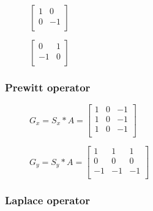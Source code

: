 \begin{figure}[!htb]
    \centering
    \begin{minipage}{.5\textwidth}
        \centering
        $\left[ \begin{array}{rr}
        1 & 0 \\
        0 & -1 \\
        \end{array}\right] $
    \end{minipage}%
    \begin{minipage}{.5\textwidth}
        \centering
        $\left[ \begin{array}{rr}
        0 & 1 \\
        -1 & 0 \\
        \end{array}\right] $
    \end{minipage}
\end{figure}

\subsubsection{Prewitt operator}

\begin{figure}[!htb]
    \centering
    \begin{minipage}{.5\textwidth}
        \centering
        $G_{x} = S_{x} * A =
        \left[ \begin{array}{rrr}
        1 & 0 & -1 \\
        1 & 0 & -1 \\
        1 & 0 & -1 \\
        \end{array}\right] $
    \end{minipage}%
    \begin{minipage}{.5\textwidth}
        \centering
        $G_{y} = S_{y} * A =
        \left[ \begin{array}{rrr}
        1 & 1 & 1 \\
        0 & 0 & 0 \\
        -1 & -1 & -1 \\
        \end{array}\right] $
    \end{minipage}
\end{figure}

\subsubsection{Laplace operator}

